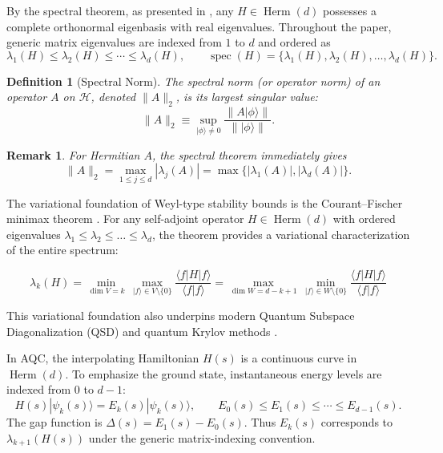 \documentclass[11pt, a4paper]{article}
\newtheorem{definition}[theorem]{Definition}
\newtheorem{remark}[theorem]{Remark}
\newcommand{\hilb}{\mathcal{H}}
\newcommand{\ket}[1]{| #1 \rangle}
\newcommand{\norm}[1]{\| #1 \|}
\newcommand{\Herm}{\operatorname{Herm}}
\newcommand{\spec}{\operatorname{spec}}
\begin{document}
By the spectral theorem, as presented in \cite{Watrous_2018}, any $H \in \Herm(d)$ possesses a complete orthonormal eigenbasis with real eigenvalues. Throughout the paper, generic matrix eigenvalues are indexed from $1$ to $d$ and ordered as
\begin{equation}
\lambda_1(H)\le \lambda_2(H)\le \cdots \le \lambda_d(H),
\qquad
\spec(H)=\{\lambda_1(H),\lambda_2(H),\dots,\lambda_d(H)\}.
\end{equation}

\begin{definition}[Spectral Norm]
The spectral norm (or operator norm) of an operator $A$ on $\hilb$, denoted $
\norm{A}_2$, is its largest singular value:
\begin{equation}
\norm{A}_2 \equiv \sup_{\ket{\phi} \neq 0} \frac{\norm{A\ket{\phi}}}{\norm{\ket{\phi}}}.
\end{equation}
\end{definition}

\begin{remark}
For Hermitian $A$, the spectral theorem immediately gives
\begin{equation}
\norm{A}_2=\max_{1\le j\le d}|\lambda_j(A)|
=\max\{|\lambda_1(A)|,|\lambda_d(A)|\}.
\end{equation}
\end{remark}

The variational foundation of Weyl-type stability bounds is the Courant--Fischer minimax theorem \cite{Bhatia2007}. For any self-adjoint operator $H \in \Herm(d)$ with ordered eigenvalues $\lambda_1 \le \lambda_2 \le \dots \le \lambda_d$, the theorem provides a variational characterization of the entire spectrum:

\begin{equation}
\label{eq:courant-fischer}
\lambda_k(H) = \min_{\dim V = k} \, \max_{|f\rangle \in V \setminus \{0\}} \frac{\langle f | H | f \rangle}{\langle f | f \rangle} = \max_{\dim W = d-k+1} \, \min_{|f\rangle \in W \setminus \{0\}} \frac{\langle f | H | f \rangle}{\langle f | f \rangle}
\end{equation}

This variational foundation also underpins modern Quantum Subspace Diagonalization (QSD) and quantum Krylov methods \cite{Parrish2019, Stair2020}.

In AQC, the interpolating Hamiltonian $H(s)$ is a continuous curve in $\Herm(d)$. To emphasize the ground state, instantaneous energy levels are indexed from $0$ to $d-1$:
\begin{equation}
H(s)\ket{\psi_k(s)}=E_k(s)\ket{\psi_k(s)},
\qquad
E_0(s)\le E_1(s)\le \cdots \le E_{d-1}(s).
\end{equation}
The gap function is $\Delta(s)=E_1(s)-E_0(s)$. Thus $E_k(s)$ corresponds to $\lambda_{k+1}(H(s))$ under the generic matrix-indexing convention.
\end{document}
